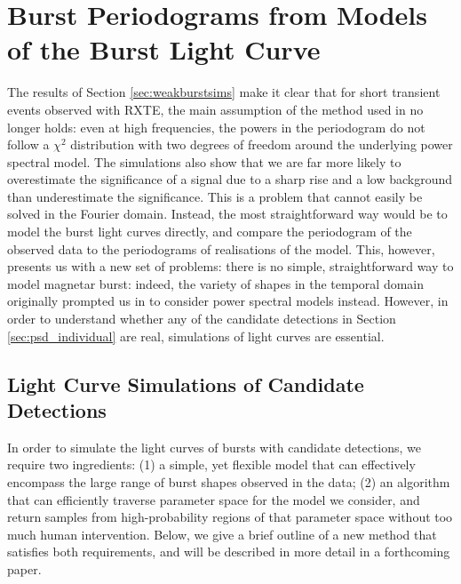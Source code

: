 \documentclass[numberedappendix]{emulateapj}
\begin{document}
\section{Burst Periodograms from Models of the Burst Light Curve}
\label{sec:dnest}

The results of Section \ref{sec:weakburstsims} make it clear that for short transient events observed with RXTE, the main assumption of the method used in \citet{huppenkothen2013} no longer holds: even at high frequencies, the powers in the periodogram do not follow a $\chi^2$ distribution with two degrees of freedom around the underlying power spectral model. The simulations also show that we are far more likely to overestimate the significance of a signal due to a sharp rise and a low background than underestimate the significance. This is a problem that cannot easily be solved in the Fourier domain. Instead, the most straightforward way would be to model the burst light curves directly, and compare the periodogram of the observed data to the periodograms of realisations of the model. This, however, presents us with a new set of problems: there is no simple, straightforward way to model magnetar burst: indeed, the variety of shapes in the temporal domain originally prompted us in \citet{huppenkothen2013} to consider power spectral models instead. However, in order to understand whether any of the candidate detections in Section \ref{sec:psd_individual} are real, simulations of light curves are essential. 

\subsection{Light Curve Simulations of Candidate Detections}

In order to simulate the light curves of bursts with candidate detections, we require two ingredients: (1) a simple, yet flexible model that can effectively encompass the large range of burst shapes observed in the data; (2) an algorithm that can efficiently traverse parameter space for the model we consider, and return samples from high-probability regions of that parameter space without too much human intervention. Below, we give a brief outline of a new method that satisfies both requirements, and will be described in more detail in a forthcoming paper.
\end{document}
